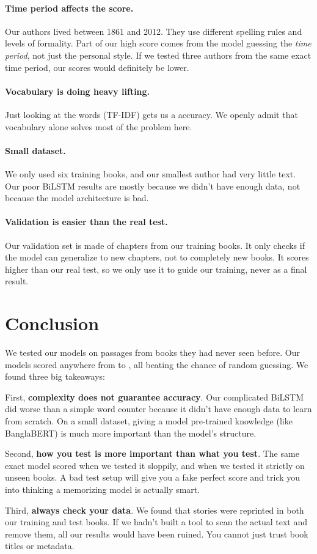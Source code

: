 \paragraph{Time period affects the score.} Our authors lived between 1861 and 2012. They use different spelling rules and levels of formality. Part of our high score comes from the model guessing the \emph{time period}, not just the personal style. If we tested three authors from the same exact time period, our scores would definitely be lower.

\paragraph{Vocabulary is doing heavy lifting.} Just looking at the words (TF-IDF) gets us a \tfidfBaselineAcc{} accuracy. We openly admit that vocabulary alone solves most of the problem here.

\paragraph{Small dataset.} We only used six training books, and our smallest author had very little text. Our poor BiLSTM results are mostly because we didn't have enough data, not because the model architecture is bad.

\paragraph{Validation is easier than the real test.} Our validation set is made of chapters from our training books. It only checks if the model can generalize to new chapters, not to completely new books. It scores higher than our real test, so we only use it to guide our training, never as a final result.

\section{Conclusion}

We tested our models on \nTest{} passages from \nUnseenBooks{} books they had never seen before. Our models scored anywhere from \bilstmAcc{} to \bertFTAcc{}, all beating the \chanceAcc{} chance of random guessing. We found three big takeaways:

First, \textbf{complexity does not guarantee accuracy}. Our complicated BiLSTM did worse than a simple word counter because it didn't have enough data to learn from scratch. On a small dataset, giving a model pre-trained knowledge (like BanglaBERT) is much more important than the model's structure.

Second, \textbf{how you test is more important than what you test}. The same exact model scored \randomSplitAcc{} when we tested it sloppily, and \workSplitAcc{} when we tested it strictly on unseen books. A bad test setup will give you a fake perfect score and trick you into thinking a memorizing model is actually smart.

Third, \textbf{always check your data}. We found that \nOverlapHits{} stories were reprinted in both our training and test books. If we hadn't built a tool to scan the actual text and remove them, all our results would have been ruined. You cannot just trust book titles or metadata.
